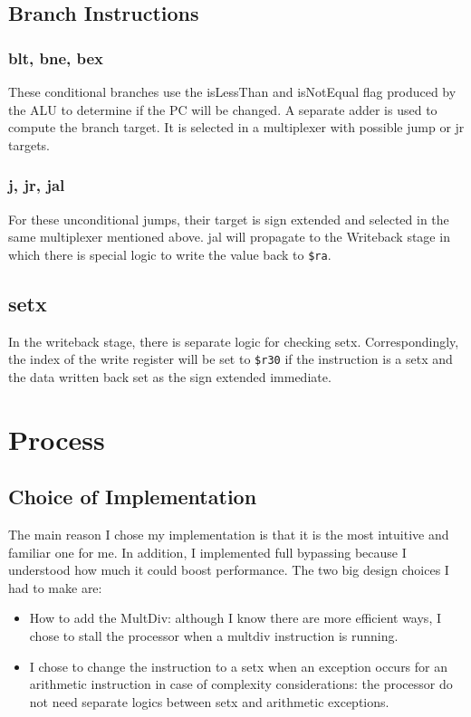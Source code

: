 \documentclass{article}
\begin{document}
\subsection{Branch Instructions}
\subsubsection{blt, bne, bex}
These conditional branches use the isLessThan and isNotEqual flag produced by the ALU to determine if the PC will be changed. A separate adder is used to compute the branch target. It is selected in a multiplexer with possible jump or jr targets.

\subsubsection{j, jr, jal}
For these unconditional jumps, their target is sign extended and selected in the same multiplexer mentioned above. jal will propagate to the Writeback stage in which there is special logic to write the value back to \texttt{\$ra}.

\subsection{setx}
In the writeback stage, there is separate logic for checking setx. Correspondingly, the index of the write register will be set to \texttt{\$r30} if the instruction is a setx and the data written back set as the sign extended immediate.

\section{Process}
\subsection{Choice of Implementation}
The main reason I chose my implementation is that it is the most intuitive and familiar one for me. In addition, I implemented full bypassing because I understood how much it could boost performance. The two big design choices I had to make are:
\begin{itemize}
    \item How to add the MultDiv: although I know there are more efficient ways, I chose to stall the processor when a multdiv instruction is running.
    \item I chose to change the instruction to a setx when an exception occurs for an arithmetic instruction in case of complexity considerations: the processor do not need separate logics between setx and arithmetic exceptions.
\end{itemize}
\end{document}
